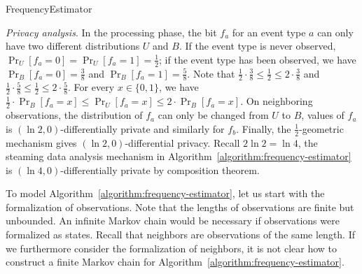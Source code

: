 \begin{algorithm}
  \begin{algorithmic}[1]
    \EndMatch
    \EndMatch
  \EndProcedure
  \end{algorithmic}
  \caption{FrequencyEstimator}
  \label{algorithm:frequency-estimator}
\end{algorithm}

\indent
\emph{Privacy analysis}.
In the processing phase, the bit $f_a$ for an event type $a$ can only
have two different distributions $U$ and $B$. If the event type is
never observed, $\Pr_U[f_a = 0] = \Pr_U[f_a = 1] = \frac{1}{2}$; if
the event type has been observed, we have $\Pr_B[f_a = 0] =
\frac{3}{8}$ and $\Pr_B[f_a = 1] = \frac{5}{8}$. Note that
$\frac{1}{2} \cdot \frac{3}{8} \leq \frac{1}{2} \leq 2 \cdot
\frac{3}{8}$ and $\frac{1}{2} \cdot \frac{5}{8} \leq \frac{1}{2} \leq
2 \cdot \frac{5}{8}$. For every $x \in \{ 0, 1 \}$, we have
$\frac{1}{2} \cdot \Pr_B[f_a = x] \leq \Pr_U[f_a = x] \leq 2 \cdot
\Pr_B[f_a = x]$. On neighboring observations, the distribution of
$f_a$ can only be changed from $U$ to $B$, values of $f_a$ is $(\ln 2,
0)$-differentially private and similarly for $f_b$. Finally, the
$\frac{1}{2}$-geometric mechanism gives $(\ln 2, 0)$-differential privacy.
Recall $2\ln 2 = \ln 4$,
the steaming data analysis mechanism in
Algorithm~\ref{algorithm:frequency-estimator} is $(\ln 4,
0)$-differentially private by
composition theorem.

To model Algorithm~\ref{algorithm:frequency-estimator}, let
us start with the formalization of observations. Note that the
lengths of observations are finite but unbounded. An infinite Markov
chain would be necessary if observations were formalized as states.
Recall that neighbors are observations of the same length. If we
furthermore consider the formalization of neighbors, it is not clear
how to construct a finite Markov chain for
Algorithm~\ref{algorithm:frequency-estimator}.

